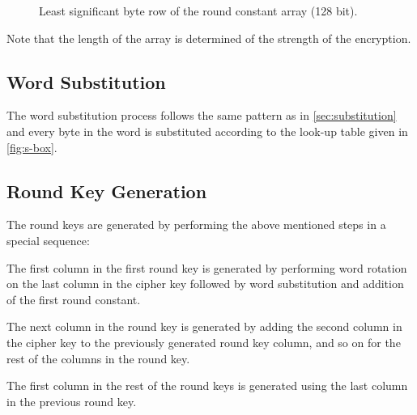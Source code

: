 \documentclass[report.tex]{subfiles}
\begin{document}
\begin{figure}[ht]
\setlength{\unitlength}{1.0cm}
	\begin{center}
	\end{center}
	\caption{Least significant byte row of the round constant array (128 bit).}
	\label{fig:round constant array}
\end{figure}
Note that the length of the array is determined of the strength of the encryption.

\subsection{Word Substitution}
	The word substitution process follows the same pattern as in \ref{sec:substitution} and every byte in the word is substituted according to the look-up table given in \ref{fig:s-box}.
	
\subsection{Round Key Generation}
The round keys are generated by performing the above mentioned steps in a special sequence:

The first column in the first round key is generated by performing word rotation on the last column in the cipher key followed by word substitution and addition of the first round constant.

The next column in the round key is generated by adding the second column in the cipher key to the previously generated round key column, and so on for the rest of the columns in the round key.

The first column in the rest of the round keys is generated using the last column in the previous round key. 
\end{document}
